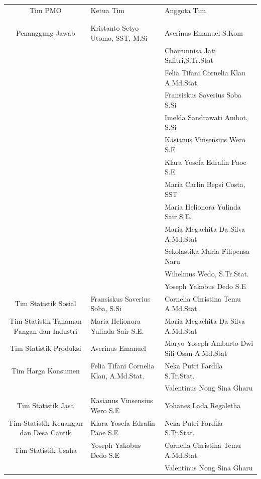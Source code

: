 \documentclass{article}
\begin{document}
\begin{longtable}{CTL}

\toprule
	\centering Tim PMO &
	\centering Ketua Tim &
	\centering Anggota Tim  
	\tabularnewline{}
	 &  &  
	\tabularnewline{}
	{} & {} & {} \\
\midrule
	Penanggung Jawab & Kristanto Setyo Utomo, SST, M.Si & Averinus Emanuel S.Kom \\
	  & & Choirunnisa Jati Safitri,S.Tr.Stat \\
	  & & Felia Tifani Cornelia Klau A.Md.Stat. \\
	  & & Fransiskus Saverius Soba S.Si \\
	  & & Imelda Sandrawati Ambot, S.Si \\
	  & & Kasianus Vinsensius Wero S.E \\
	  & & Klara Yosefa Edralin Paoe S.E \\
	  & & Maria Carlin Bepsi Costa, SST \\
	  & & Maria Helionora Yulinda Sair S.E. \\
	  & & Maria Megachita Da Silva A.Md.Stat \\
	  & & Sekolastika Maria Filipensa Naru \\
	  & & Wihelmus Wedo, S.Tr.Stat. \\
	  & & Yoseph Yakobus Dedo S.E \\
\midrule
	Tim Statistik Sosial & Fransiskus Saverius Soba, S.Si & Cornelia Christina Temu A.Md.Stat. \\
\midrule
	Tim Statistik Tanaman Pangan dan Industri & Maria Helionora Yulinda Sair S.E. & Maria Megachita Da Silva A.Md.Stat \\
\midrule
	Tim Statistik Produksi & Averinus Emanuel & Maryo Yoseph Ambarto Dwi Sili Osan A.Md.Stat \\
\midrule
	Tim Harga Konsumen & Felia Tifani Cornelia Klau, A.Md.Stat. & Neka Putri Fardila S.Tr.Stat. \\
	{} & {} & Valentinus Nong Sina Gharu \\
\midrule
	Tim Statistik Jasa & Kasianus Vinsensius Wero S.E & Yohanes Lada Regaletha  \\
\midrule
	Tim Statistik Keuangan dan Desa Cantik & Klara Yosefa Edralin Paoe S.E & Neka Putri Fardila S.Tr.Stat.  \\
\midrule
	Tim Statistik Usaha & Yoseph Yakobus Dedo S.E & Cornelia Christina Temu A.Md.Stat.  \\
	{} & {} & Valentinus Nong Sina Gharu  \\

\end{longtable}
\end{document}
